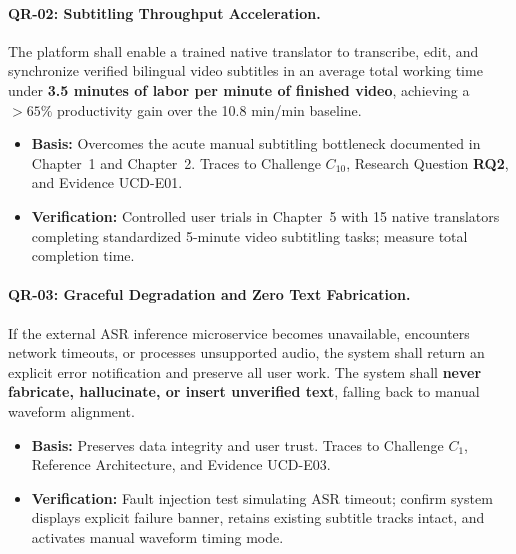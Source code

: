 \documentclass[a4paper,11pt]{article}
\begin{document}
\paragraph{QR-02: Subtitling Throughput Acceleration.}
The platform shall enable a trained native translator to transcribe, edit, and synchronize verified bilingual video subtitles in an average total working time under \textbf{3.5 minutes of labor per minute of finished video}, achieving a $>65\%$ productivity gain over the 10.8 min/min baseline.
\begin{itemize}
    \item \textbf{Basis:} Overcomes the acute manual subtitling bottleneck documented in Chapter~1 and Chapter~2. Traces to Challenge $C_{10}$, Research Question \textbf{RQ2}, and Evidence UCD-E01.
    \item \textbf{Verification:} Controlled user trials in Chapter~5 with 15 native translators completing standardized 5-minute video subtitling tasks; measure total completion time.
\end{itemize}

\paragraph{QR-03: Graceful Degradation and Zero Text Fabrication.}
If the external ASR inference microservice becomes unavailable, encounters network timeouts, or processes unsupported audio, the system shall return an explicit error notification and preserve all user work. The system shall \textbf{never fabricate, hallucinate, or insert unverified text}, falling back to manual waveform alignment.
\begin{itemize}
    \item \textbf{Basis:} Preserves data integrity and user trust. Traces to Challenge $C_1$, Reference Architecture, and Evidence UCD-E03.
    \item \textbf{Verification:} Fault injection test simulating ASR timeout; confirm system displays explicit failure banner, retains existing subtitle tracks intact, and activates manual waveform timing mode.
\end{itemize}
\end{document}
